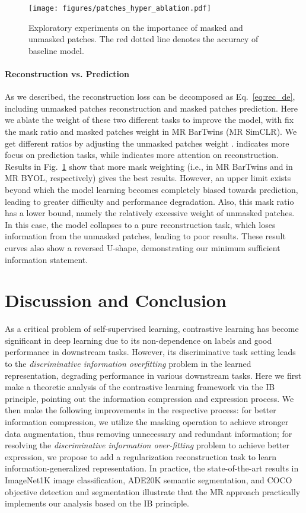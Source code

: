 \documentclass[10pt,twocolumn,letterpaper]{article}
\begin{document}
\begin{figure}[h!]
    \centering
    \texttt{[image: figures/patches\_hyper\_ablation.pdf]}
    \caption{Exploratory experiments on the importance of masked and unmasked patches. The red dotted line denotes the accuracy of baseline model.}
    \label{fig:abl3}
\end{figure}
\paragraph{Reconstruction vs. Prediction}
As we described, the reconstruction loss can be decomposed as Eq.~\eqref{eq:rec_de}, including unmasked patches reconstruction and masked patches prediction. Here we ablate the weight of these two different tasks to improve the model, with fix the mask ratio  and masked patches weight  in MR BarTwins (MR SimCLR). We get different  ratios by adjusting the unmasked patches weight .  indicates more focus on prediction tasks, while  indicates more attention on reconstruction.
Results in Fig.~\ref{fig:abl3} show that more mask weighting (i.e.,  in MR BarTwins and  in MR BYOL, respectively) gives the best results. However, an upper limit exists beyond which the model learning becomes completely biased towards prediction, leading to greater difficulty and performance degradation. Also, this mask ratio has a lower bound, namely the relatively excessive weight of unmasked patches. In this case, the model collapses to a pure reconstruction task, which loses information from the unmasked patches, leading to poor results. These result curves also show a reversed U-shape, demonstrating our minimum sufficient information statement.
\section{Discussion and Conclusion}
As a critical problem of self-supervised learning, contrastive learning has become significant in deep learning due to its non-dependence on labels and good performance in downstream tasks. However, its discriminative task setting leads to the \textit{discriminative information overfitting} problem in the learned representation, degrading performance in various downstream tasks. Here we first make a theoretic analysis of the contrastive learning framework via the IB principle, pointing out the information compression and expression process. We then make the following improvements in the respective process: for better information compression, we utilize the masking operation to achieve stronger data augmentation, thus removing unnecessary and redundant information; for resolving the \textit{discriminative information over-fitting} problem to achieve better expression, we propose to add a regularization reconstruction task to learn information-generalized representation. In practice, the state-of-the-art results in ImageNet1K image classification, ADE20K semantic segmentation, and COCO objective detection and segmentation illustrate that the MR approach practically implements our analysis based on the IB principle.
\end{document}

